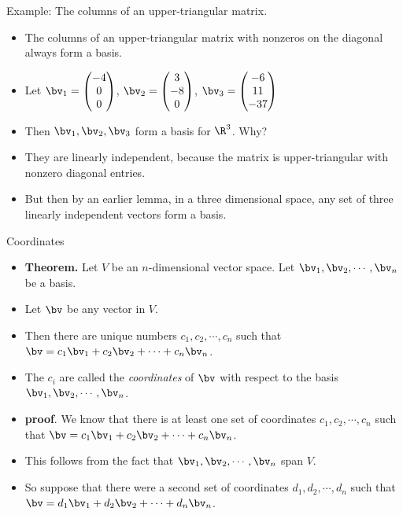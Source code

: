 \documentclass{beamer}
\begin{document}
\begin{frame}{Example: The columns of an upper-triangular matrix.}

\begin{itemize}
\item The columns of an upper-triangular matrix with nonzeros on the
diagonal always form a basis.
\item Let
$
\bv_1 =
\begin{pmatrix}
-4 \\ 0 \\ 0
\end{pmatrix}
$,
$
\bv_2 =
\begin{pmatrix}
3 \\ -8 \\ 0
\end{pmatrix}
$,
$
\bv_3 =
\begin{pmatrix}
-6 \\ 11 \\ -37
\end{pmatrix}
$
\item Then $\bv_1,\bv_2,\bv_3$ form a basis for $\R^3$. Why?
\item They are linearly independent, because the matrix is upper-triangular with nonzero diagonal entries.
\item But then by an earlier lemma, in a three dimensional space, any set of three linearly independent
vectors form a basis.
\end{itemize}

\end{frame}

\begin{frame}{Coordinates}

\begin{itemize}
\item \textbf{Theorem.} Let $V$ be an $n$-dimensional vector space. Let $\bv_1,\bv_2,\cdots,\bv_n$ be a basis.
\item Let $\bv$ be any vector in $V$.
\item Then there are unique numbers $c_1,c_2,\cdots,c_n$ such that $\bv = c_1 \bv_1 + c_2\bv_2 + \cdots + c_n\bv_n$.
\item The $c_i$ are called the \emph{coordinates} of $\bv$ with respect to the basis $\bv_1,\bv_2,\cdots,\bv_n$.
\item \textbf{proof}. We know that there is at least one set of coordinates $c_1,c_2,\cdots,c_n$ such that $\bv = c_1 \bv_1 + c_2\bv_2 + \cdots + c_n\bv_n$.
\item This follows from the fact that $\bv_1,\bv_2,\cdots,\bv_n$ span $V$.
\item So suppose that there were a second set of coordinates $d_1,d_2,\cdots,d_n$ such that $\bv = d_1 \bv_1 + d_2\bv_2 + \cdots + d_n\bv_n$.
\end{itemize}
\end{frame}
\end{document}
